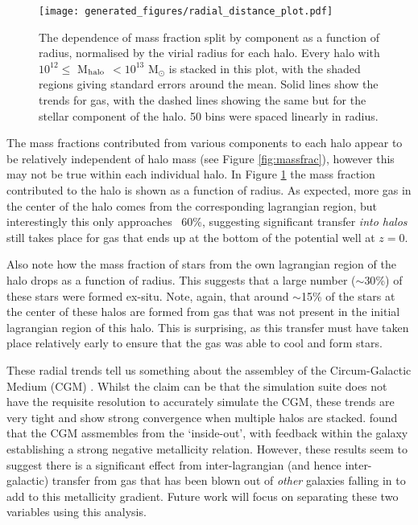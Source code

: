 \begin{figure} \centering
	\texttt{[image: generated\_figures/radial\_distance\_plot.pdf]}
	\caption{The dependence of mass fraction split by component as a
	function of radius, normalised by the virial radius for each halo.
	Every halo with $10^{12} \leq $ M$_{\rm halo}$ $ < 10^{13}$ M$_\odot$
	is stacked in this plot, with the shaded regions giving standard errors
	around the mean. Solid lines show the trends for gas, with the dashed
	lines showing the same but for the stellar component of the halo. 50
	bins were spaced linearly in radius.} \label{fig:radialmassfrac}
\end{figure}

The mass fractions contributed from various components to each halo appear to
be relatively independent of halo mass (see Figure \ref{fig:massfrac}), however
this may not be true within each individual halo. In Figure
\ref{fig:radialmassfrac} the mass fraction contributed to the halo is shown as
a function of radius. As expected, more gas in the center of the halo comes
from the corresponding lagrangian region, but interestingly this only
approaches ~60\%, suggesting significant transfer \emph{into halos} still takes
place for gas that ends up at the bottom of the potential well at $z=0$.

Also note how the mass fraction of stars from the own lagrangian region of the
halo drops as a function of radius. This suggests that a large number ($\sim{}30$\%)
of these stars were formed ex-situ. Note, again, that around $\sim{}$15\% of the stars
at the center of these halos are formed from gas that was not present in the
initial lagrangian region of this halo. This is surprising, as this transfer
must have taken place relatively early to ensure that the gas was able to cool
and form stars.

These radial trends tell us something about the assembley of the
Circum-Galactic Medium (CGM) \citep{tumlinson2017}. Whilst the claim can be
that the \simba{} simulation suite does not have the requisite resolution to
accurately simulate the CGM, these trends are very tight and show strong
convergence when multiple halos are stacked.  \citet{Crain2013} found that the
CGM assmembles from the `inside-out', with feedback within the galaxy
establishing a strong negative metallicity relation.  However, these results
seem to suggest there is a significant effect from inter-lagrangian (and hence
inter-galactic) transfer from gas that has been blown out of \emph{other}
galaxies falling in to add to this metallicity gradient.  Future work will
focus on separating these two variables using this analysis.
